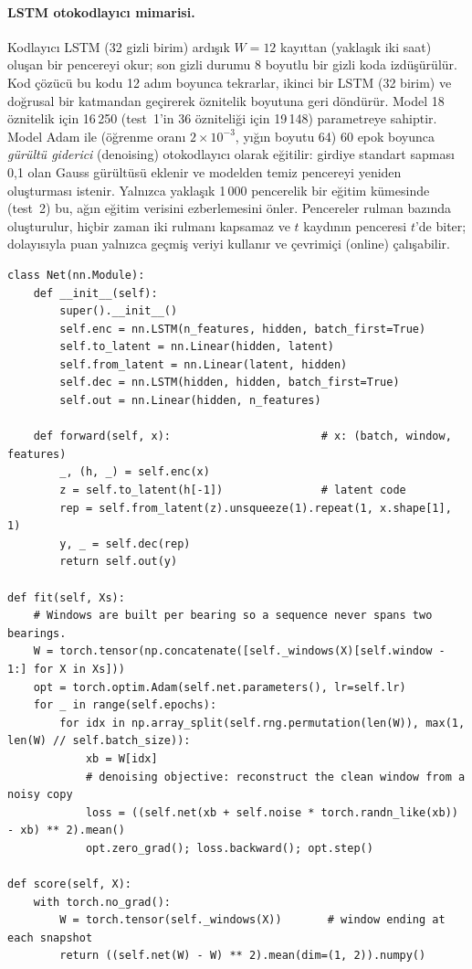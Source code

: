 \documentclass[11pt]{article}
\begin{document}
\paragraph{LSTM otokodlayıcı mimarisi.} Kodlayıcı LSTM (32 gizli birim) ardışık $W=12$ kayıttan
(yaklaşık iki saat) oluşan bir pencereyi okur; son gizli durumu 8 boyutlu bir gizli koda izdüşürülür.
Kod çözücü bu kodu 12 adım boyunca tekrarlar, ikinci bir LSTM (32 birim) ve doğrusal bir katmandan
geçirerek öznitelik boyutuna geri döndürür. Model 18 öznitelik için 16\,250 (test~1'in 36 özniteliği
için 19\,148) parametreye sahiptir. Model Adam ile (öğrenme oranı $2\times10^{-3}$, yığın boyutu 64) 60
epok boyunca \emph{gürültü giderici} (denoising) otokodlayıcı olarak eğitilir: girdiye standart sapması
0,1 olan Gauss gürültüsü eklenir ve modelden temiz pencereyi yeniden oluşturması istenir. Yalnızca
yaklaşık 1\,000 pencerelik bir eğitim kümesinde (test~2) bu, ağın eğitim verisini ezberlemesini önler.
Pencereler rulman bazında oluşturulur, hiçbir zaman iki rulmanı kapsamaz ve $t$ kaydının penceresi $t$'de
biter; dolayısıyla puan yalnızca geçmiş veriyi kullanır ve çevrimiçi (online) çalışabilir.

\begin{lstlisting}[caption={LSTM otokodlayıcı (\code{src/bearing\_efw/models.py}'den alıntı).},label=lst:lstm]
class Net(nn.Module):
    def __init__(self):
        super().__init__()
        self.enc = nn.LSTM(n_features, hidden, batch_first=True)
        self.to_latent = nn.Linear(hidden, latent)
        self.from_latent = nn.Linear(latent, hidden)
        self.dec = nn.LSTM(hidden, hidden, batch_first=True)
        self.out = nn.Linear(hidden, n_features)

    def forward(self, x):                       # x: (batch, window, features)
        _, (h, _) = self.enc(x)
        z = self.to_latent(h[-1])               # latent code
        rep = self.from_latent(z).unsqueeze(1).repeat(1, x.shape[1], 1)
        y, _ = self.dec(rep)
        return self.out(y)

def fit(self, Xs):
    # Windows are built per bearing so a sequence never spans two bearings.
    W = torch.tensor(np.concatenate([self._windows(X)[self.window - 1:] for X in Xs]))
    opt = torch.optim.Adam(self.net.parameters(), lr=self.lr)
    for _ in range(self.epochs):
        for idx in np.array_split(self.rng.permutation(len(W)), max(1, len(W) // self.batch_size)):
            xb = W[idx]
            # denoising objective: reconstruct the clean window from a noisy copy
            loss = ((self.net(xb + self.noise * torch.randn_like(xb)) - xb) ** 2).mean()
            opt.zero_grad(); loss.backward(); opt.step()

def score(self, X):
    with torch.no_grad():
        W = torch.tensor(self._windows(X))       # window ending at each snapshot
        return ((self.net(W) - W) ** 2).mean(dim=(1, 2)).numpy()
\end{lstlisting}
\end{document}
